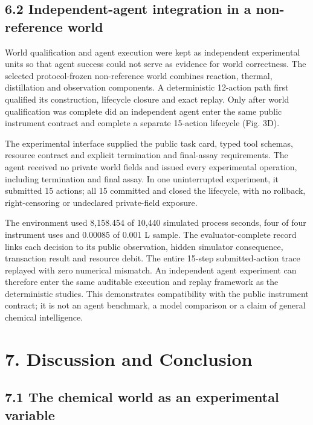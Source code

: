\documentclass[10pt,twocolumn]{article}
\begin{document}
\subsection{6.2 Independent-agent integration in a non-reference
world}\label{independent-agent-integration-in-a-non-reference-world}

World qualification and agent execution were kept as independent
experimental units so that agent success could not serve as evidence for
world correctness. The selected protocol-frozen non-reference world
combines reaction, thermal, distillation and observation components. A
deterministic 12-action path first qualified its construction, lifecycle
closure and exact replay. Only after world qualification was complete
did an independent agent enter the same public instrument contract and
complete a separate 15-action lifecycle (Fig. 3D).

The experimental interface supplied the public task card, typed tool
schemas, resource contract and explicit termination and final-assay
requirements. The agent received no private world fields and issued
every experimental operation, including termination and final assay. In
one uninterrupted experiment, it submitted 15 actions; all 15 committed
and closed the lifecycle, with no rollback, right-censoring or
undeclared private-field exposure.

The environment used 8,158.454 of 10,440 simulated process seconds, four
of four instrument uses and 0.00085 of 0.001 L sample. The
evaluator-complete record links each decision to its public observation,
hidden simulator consequence, transaction result and resource debit. The
entire 15-step submitted-action trace replayed with zero numerical
mismatch. An independent agent experiment can therefore enter the same
auditable execution and replay framework as the deterministic studies.
This demonstrates compatibility with the public instrument contract; it
is not an agent benchmark, a model comparison or a claim of general
chemical intelligence.

\section{7. Discussion and Conclusion}\label{discussion-and-conclusion}

\subsection{7.1 The chemical world as an experimental
variable}\label{the-chemical-world-as-an-experimental-variable}
\end{document}
